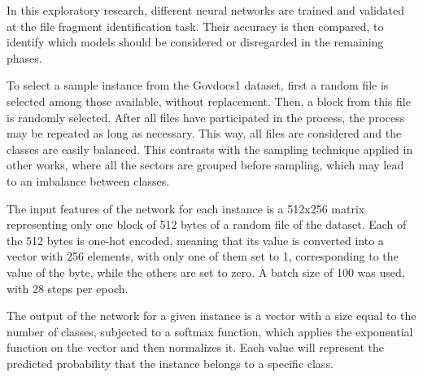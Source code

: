 \label{sec:evalmodels}

In this exploratory research, different neural networks are trained and validated
at the file fragment identification task. Their accuracy is then compared,
to identify which models should be considered or disregarded in the remaining phases.


To select a sample instance from the Govdocs1 dataset, first a random file is selected among those available, without replacement. Then, a block from this file is randomly selected. After all files have participated in the process, the process may be repeated as long as necessary. This way, all files are considered and the classes are easily balanced.
This contrasts with the sampling technique applied in other works, where all the sectors are grouped before sampling, which may lead to an imbalance between classes.

The input features of the network for each instance is a 512x256 matrix representing only one block of 512 bytes of a random file of the dataset. Each of the 512 bytes is one-hot encoded, meaning that its value is converted into a vector with 256 elements, with only one of them set to 1, corresponding to the value of the byte, while the others are set to zero. A batch size of 100 was used, with 28 steps per epoch.


The output of the network for a given instance is a vector with a size equal to the number of classes, subjected to a softmax function, which applies the exponential function on the vector and then normalizes it. Each value will represent the predicted probability that the instance belongs to a specific class.


